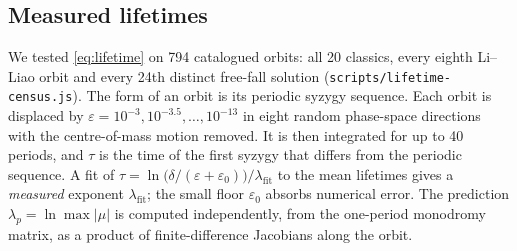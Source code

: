 \documentclass[11pt]{article}
\theoremstyle{remark}
\begin{document}
\subsection{Measured lifetimes}
\label{sec:lifetimes}

We tested \eqref{eq:lifetime} on 794 catalogued orbits: all 20 classics, every eighth Li--Liao orbit and every
24th distinct free-fall solution (\texttt{scripts/lifetime-census.js}). The form of an orbit is its periodic
syzygy sequence. Each orbit is displaced by $\varepsilon=10^{-3},10^{-3.5},\dots,10^{-13}$ in eight random
phase-space directions with the centre-of-mass motion removed. It is then integrated for up to 40 periods, and
$\tau$ is the time of the first syzygy that differs from the periodic sequence. A fit of
$\tau=\ln\!\bigl(\delta/(\varepsilon+\varepsilon_0)\bigr)/\lambda_{\text{fit}}$ to the mean lifetimes gives a
\emph{measured} exponent $\lambda_{\text{fit}}$; the small floor $\varepsilon_0$ absorbs numerical error. The
prediction $\lambda_p=\ln\max|\mu|$ is computed independently, from the one-period monodromy matrix, as a product
of finite-difference Jacobians along the orbit.
\end{document}
